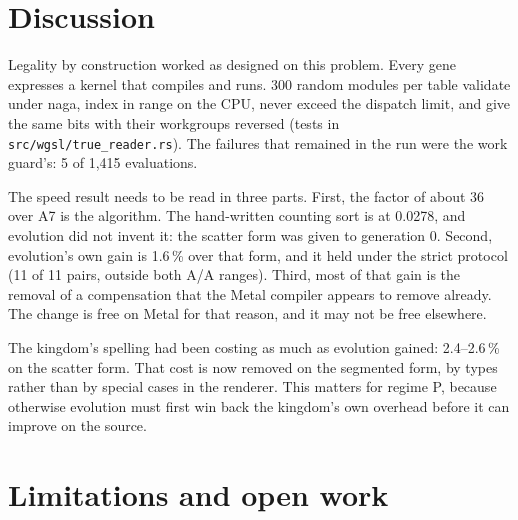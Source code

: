 \documentclass[sigconf,nonacm]{acmart}
\newcommand{\src}[1]{{\footnotesize\nolinkurl{#1}}}
\begin{document}
\section{Discussion}

Legality by construction worked as designed on this problem. Every gene
expresses a kernel that compiles and runs. 300 random modules per table
validate under naga, index in range on the CPU, never exceed the dispatch
limit, and give the same bits with their workgroups reversed (tests in
\src{src/wgsl/true_reader.rs}). The failures that remained in the run were
the work guard's: 5 of 1,415 evaluations.

The speed result needs to be read in three parts. First, the factor of about 36
over A7 is the algorithm. The hand-written counting sort is at 0.0278, and
evolution did not invent it: the scatter form was given to generation 0.
Second, evolution's own gain is 1.6\,\% over that form, and it held under the
strict protocol (11 of 11 pairs, outside both A/A ranges). Third, most of that
gain is the removal of a compensation that the Metal compiler appears to remove
already. The change is free on Metal for that reason, and it may not be free
elsewhere.

The kingdom's spelling had been costing as much as evolution gained: 2.4--2.6\,\%
on the scatter form. That cost is now removed on the segmented form, by types
rather than by special cases in the renderer. This matters for regime P,
because otherwise evolution must first win back the kingdom's own overhead
before it can improve on the source.

\section{Limitations and open work}
\label{sec:limits}
\end{document}
